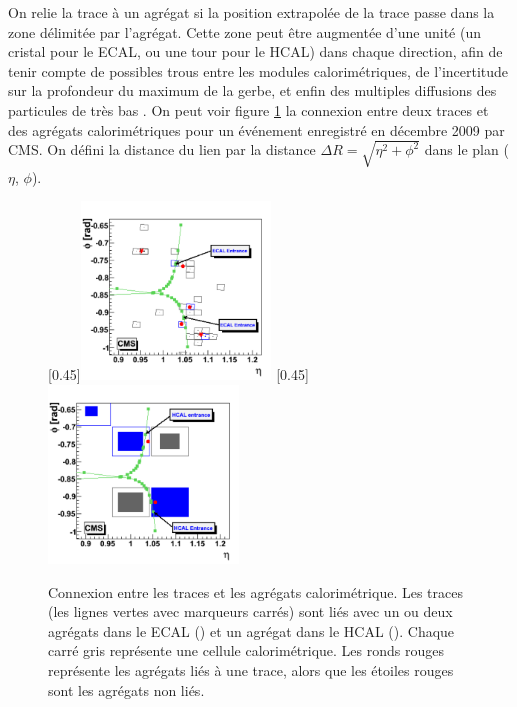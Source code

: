 On relie la trace à un agrégat si la position extrapolée de la trace passe dans la zone délimitée par l'agrégat. Cette zone peut être augmentée d'une unité (un cristal pour le ECAL, ou une tour pour le HCAL) dans chaque direction, afin de tenir compte de possibles trous entre les modules calorimétriques, de l'incertitude sur la profondeur du maximum de la gerbe, et enfin des multiples diffusions des particules de très bas \pt. On peut voir figure \ref{fig:pf_links} la connexion entre deux traces et des agrégats calorimétriques pour un événement enregistré en décembre 2009 par CMS. On défini la distance du lien par la distance $\Delta R = \sqrt{\eta^2 + \phi^2}$ dans le plan ($\eta$, $\phi$).

\begin{figure}
  [0.45\textwidth]{\includegraphics[width=0.45\textwidth]{chapitre3/figs/pf_links_ecal.png}}\hfill
  [0.45\textwidth]{\includegraphics[width=0.45\textwidth]{chapitre3/figs/pf_links_hcal.png}}
  \caption{Connexion entre les traces et les agrégats calorimétrique. Les traces (les lignes vertes avec marqueurs carrés) sont liés avec un ou deux agrégats dans le ECAL () et un agrégat dans le HCAL (). Chaque carré gris représente une cellule calorimétrique. Les ronds rouges représente les agrégats liés à une trace, alors que les étoiles rouges sont les agrégats non liés.}
  \label{fig:pf_links}
\end{figure}

